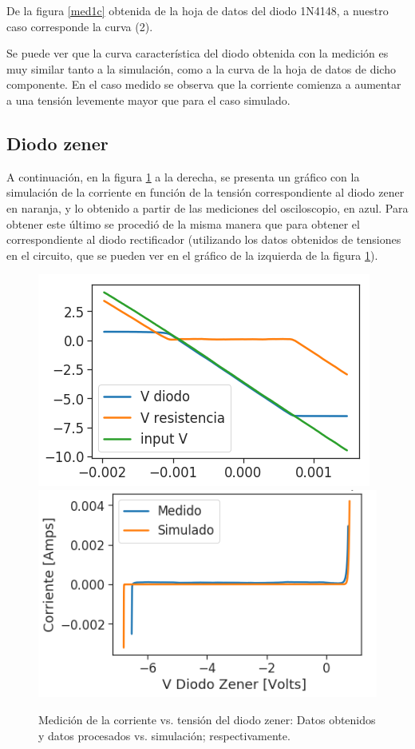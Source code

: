 De la figura \ref{med1c} obtenida de la hoja de datos del diodo 1N4148, a nuestro caso corresponde la curva (2).

Se puede ver que la curva caracter\'istica del diodo obtenida con la medici\'on es muy similar tanto a la simulaci\'on, como a la curva de la hoja de datos de dicho componente. En el caso medido se observa que la corriente comienza a aumentar a una tensi\'on levemente mayor que para el caso simulado.

\subsection*{\color{orange}Diodo zener}

A continuaci\'on, en la figura \ref{med2b} a la derecha, se presenta un gr\'afico con la simulaci\'on de la corriente en funci\'on de la tensi\'on correspondiente al diodo zener en naranja, y lo obtenido a partir de las mediciones del osciloscopio, en azul. Para obtener este \'ultimo se procedi\'o de la misma manera que para obtener el correspondiente al diodo rectificador (utilizando los datos obtenidos de tensiones en el circuito, que se pueden ver en el gr\'afico de la izquierda de la figura \ref{med2b}).


\begin{figure}[H]
\centering
\includegraphics[scale=0.5]{../EJ1/DiodoZener/datosOsciloscopioZener}
\includegraphics[scale=0.5]{../EJ1/DiodoZener/zenerSuperpos}
\caption{Medici\'on de la corriente vs. tensi\'on del diodo zener: Datos obtenidos y datos procesados vs. simulación; respectivamente.}
\label{med2b}
\end{figure}

